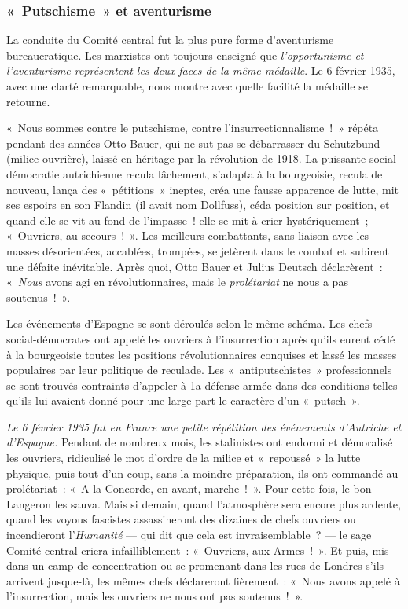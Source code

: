 \documentclass[french,twoside]{book} %
\begin{document}
\subsubsection[{« Putschisme » et aventurisme}]{« Putschisme » et aventurisme}
\noindent La conduite du Comité central fut la plus pure forme d’aventurisme bureaucratique. Les marxistes ont toujours enseigné que \emph{l’opportunisme et l’aventurisme représentent les deux faces de la même médaille}. Le 6 février 1935, avec une clarté remarquable, nous montre avec quelle facilité la médaille se retourne.\par
« Nous sommes contre le putschisme, contre l’insurrectionnalisme ! » répéta pendant des années Otto Bauer, qui ne sut pas se débarrasser du Schutzbund (milice ouvrière), laissé en héritage par la révolution de 1918. La puissante social-démocratie autrichienne recula lâchement, s’adapta à la bourgeoisie, recula de nouveau, lança des « pétitions » ineptes, créa une fausse apparence de lutte, mit ses espoirs en son Flandin (il avait nom Dollfuss),  céda position sur position, et quand elle se vit au fond de l’impasse ! elle se mit à crier hystériquement ; « Ouvriers, au secours ! ». Les meilleurs combattants, sans liaison avec les masses désorientées, accablées, trompées, se jetèrent dans le combat et subirent une défaite inévitable. Après quoi, Otto Bauer et Julius Deutsch déclarèrent : « \emph{Nous} avons agi en révolutionnaires, mais le \emph{prolétariat} ne nous a pas soutenus ! ».\par
Les événements d’Espagne se sont déroulés selon le même schéma. Les chefs social-démocrates ont appelé les ouvriers à l’insurrection après qu’ils eurent cédé à la bourgeoisie toutes les positions révolutionnaires conquises et lassé les masses populaires par leur politique de reculade. Les « antiputschistes » professionnels se sont trouvés contraints d’appeler à 1a défense armée dans des conditions telles qu’ils lui avaient donné pour une large part le caractère d’un « putsch ».\par
\emph{Le 6 février 1935 fut en France une petite répétition des événements d’Autriche et d’Espagne.} Pendant de nombreux mois, les stalinistes ont endormi et démoralisé les ouvriers, ridiculisé le mot d’ordre de la milice et « repoussé » la lutte physique, puis tout d’un coup, sans la moindre préparation, ils ont commandé au prolétariat : « A la Concorde, en avant, marche ! ». Pour cette fois, le bon Langeron les sauva. Mais si demain, quand l’atmosphère sera encore plus ardente, quand les voyous fascistes assassineront des dizaines de chefs ouvriers ou incendieront l’\emph{Humanité} — qui dit que cela est invraisemblable ? — le sage Comité central criera infailliblement : « Ouvriers, aux Armes ! ». Et puis, mis dans un camp de concentration ou se promenant dans les rues de Londres s’ils arrivent jusque-là, les mêmes chefs déclareront fièrement : « Nous avons appelé à l’insurrection, mais les ouvriers ne nous ont pas soutenus ! ».
\end{document}
